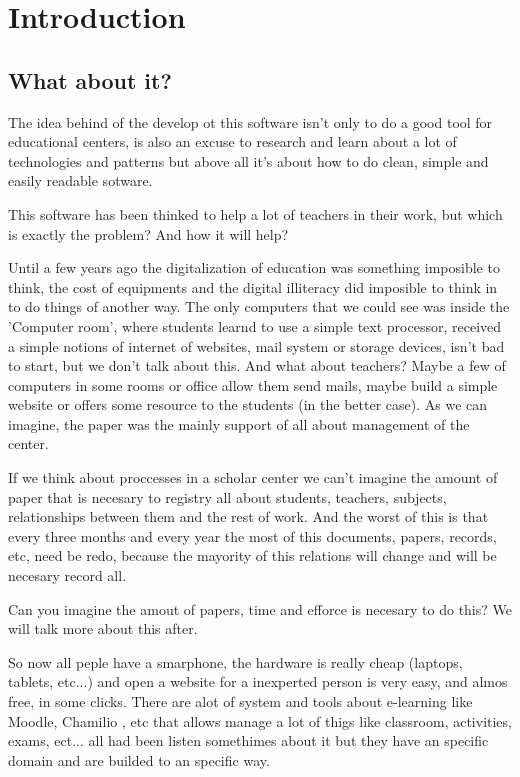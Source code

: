 \chapter{Introduction}

\section{What about it?}

The idea behind of the develop ot this software isn't only to do a
good tool for educational centers, is also an excuse to research and
learn about a lot of technologies and patterns but above all it's
about how to do clean, simple and easily readable sotware.

This software has been thinked to help a lot of teachers in their
work, but which is exactly the problem? And how it will help?

Until a few years ago the digitalization of education was something
imposible to think, the cost of equipments and the digital illiteracy
did imposible to think in to do things of another way. The only computers
that we could see was inside the 'Computer room', where students learnd
to use a simple text processor, received a simple notions of internet
of websites, mail system or storage devices, isn't bad to start, but
we don't talk about this. And what about teachers? Maybe a few of
computers in some rooms or office allow them send mails, maybe build
a simple website or offers some resource to the students (in the better
case). As we can imagine, the paper was the mainly support of all
about management of the center.

If we think about proccesses in a scholar center we can't imagine
the amount of paper that is necesary to registry all about students,
teachers, subjects, relationships between them and the rest of work.
And the worst of this is that every three months and every year the
most of this documents, papers, records, etc, need be redo, because
the mayority of this relations will change and will be necesary record
all.

Can you imagine the amout of papers, time and efforce is necesary
to do this? We will talk more about this after.

So now all peple have a smarphone, the hardware is really cheap (laptops,
tablets, etc...) and open a website for a inexperted person is very
easy, and almos free, in some clicks. There are alot of system and
tools about e-learning like Moodle, Chamilio , etc that allows manage
a lot of thigs like classroom, activities, exams, ect... all had been
listen somethimes about it but they have an specific domain and are
builded to an specific way.

